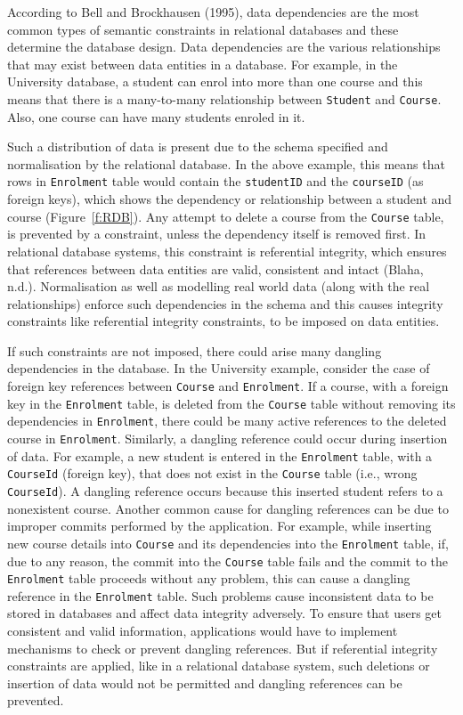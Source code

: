 According to Bell and Brockhausen (1995), data dependencies are the most
common types of semantic constraints in relational databases and these determine
the database design. Data dependencies are the various relationships that may
exist between data entities in a database. For example, in the
University database, a student can enrol into more than one course and this
means that there is a many-to-many relationship between \texttt{Student} and
\texttt{Course}. Also, one course can have many students enroled in it. 

Such a distribution of data is present due to the schema specified and
normalisation by the relational database. In the above example, this means that
rows in \texttt{Enrolment} table would contain the \texttt{studentID} and the
\texttt{courseID} (as foreign keys), which shows the dependency or relationship
between a student and course (Figure~\ref{f:RDB}).
Any attempt to delete a course from the \texttt{Course} table, is prevented by a
constraint, unless the dependency itself is removed first. In relational
database systems, this constraint is referential integrity, which ensures that
references between data entities are valid, consistent and intact (Blaha, n.d.).
Normalisation as well as modelling real world data (along with the real
relationships) enforce such dependencies in the schema and this causes integrity
constraints like referential integrity constraints, to be imposed on data
entities.

If such constraints are not imposed, there could arise many dangling
dependencies in the database. In the University example, consider the
case of foreign key references between \texttt{Course} and \texttt{Enrolment}.
If a course, with a foreign key in the \texttt{Enrolment} table, is deleted from
the \texttt{Course} table without removing its dependencies in
\texttt{Enrolment}, there could be many active references to the deleted course
in \texttt{Enrolment}. Similarly, a dangling reference could occur during
insertion of data. For example, a new student is entered in the
\texttt{Enrolment} table, with a \texttt{CourseId} (foreign key), that does not
exist in the \texttt{Course} table (i.e., wrong \texttt{CourseId}). A dangling
reference occurs because this inserted student refers to a nonexistent course.
Another common cause for dangling references can be due to improper commits
performed by the application. For example, while inserting new course details
into \texttt{Course} and its dependencies into the \texttt{Enrolment} table, if,
due to any reason, the commit into the \texttt{Course} table fails and the
commit to the \texttt{Enrolment} table proceeds without any problem, this can
cause a dangling reference in the \texttt{Enrolment} table. Such problems cause
inconsistent data to be stored in databases and affect data integrity adversely.
To ensure that users get consistent and valid information, applications would
have to implement mechanisms to check or prevent dangling references. But if
referential integrity constraints are applied, like in a relational database
system, such deletions or insertion of data would not be permitted and dangling
references can be prevented.

